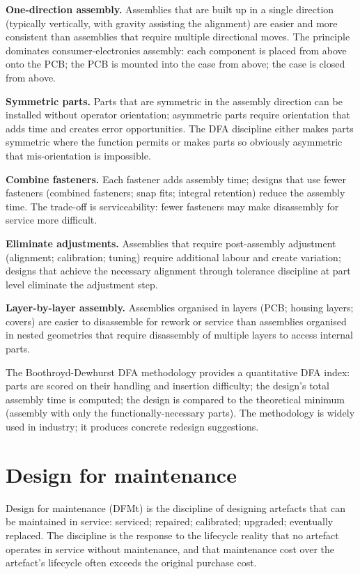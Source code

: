 \textbf{One-direction assembly.} Assemblies that are built up in a single direction (typically vertically, with gravity assisting the alignment) are easier and more consistent than assemblies that require multiple directional moves. The principle dominates consumer-electronics assembly: each component is placed from above onto the PCB; the PCB is mounted into the case from above; the case is closed from above.

\textbf{Symmetric parts.} Parts that are symmetric in the assembly direction can be installed without operator orientation; asymmetric parts require orientation that adds time and creates error opportunities. The DFA discipline either makes parts symmetric where the function permits or makes parts so obviously asymmetric that mis-orientation is impossible.

\textbf{Combine fasteners.} Each fastener adds assembly time; designs that use fewer fasteners (combined fasteners; snap fits; integral retention) reduce the assembly time. The trade-off is serviceability: fewer fasteners may make disassembly for service more difficult.

\textbf{Eliminate adjustments.} Assemblies that require post-assembly adjustment (alignment; calibration; tuning) require additional labour and create variation; designs that achieve the necessary alignment through tolerance discipline at part level eliminate the adjustment step.

\textbf{Layer-by-layer assembly.} Assemblies organised in layers (PCB; housing layers; covers) are easier to disassemble for rework or service than assemblies organised in nested geometries that require disassembly of multiple layers to access internal parts.

The Boothroyd-Dewhurst DFA methodology provides a quantitative DFA index: parts are scored on their handling and insertion difficulty; the design's total assembly time is computed; the design is compared to the theoretical minimum (assembly with only the functionally-necessary parts). The methodology is widely used in industry; it produces concrete redesign suggestions.

\section{Design for maintenance}

Design for maintenance (DFMt) is the discipline of designing artefacts that can be maintained in service: serviced; repaired; calibrated; upgraded; eventually replaced. The discipline is the response to the lifecycle reality that no artefact operates in service without maintenance, and that maintenance cost over the artefact's lifecycle often exceeds the original purchase cost.

